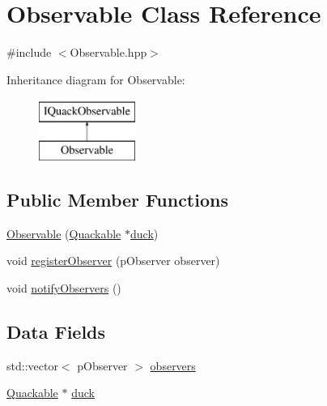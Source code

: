 \hypertarget{classObservable}{\section{Observable Class Reference}
\label{classObservable}
}


{\ttfamily \#include $<$Observable.\-hpp$>$}

Inheritance diagram for Observable\-:\begin{figure}[H]
\begin{center}
\leavevmode
\includegraphics[height=2.000000cm]{classObservable}
\end{center}
\end{figure}
\subsection*{Public Member Functions}
\begin{DoxyCompactItemize}
\item 
\hyperlink{classObservable_a59998e0044f29315ab3ba641a8a5c778}{Observable} (\hyperlink{classQuackable}{Quackable} $\ast$\hyperlink{classObservable_ae1a02e816895e53c27e3229666756a2c}{duck})
\item 
void \hyperlink{classObservable_ac6a84599589838adccb4d182182e645f}{register\-Observer} (p\-Observer observer)
\item 
void \hyperlink{classObservable_ad88b0ad8e623c5450ac3857daeb1c330}{notify\-Observers} ()
\end{DoxyCompactItemize}
\subsection*{Data Fields}
\begin{DoxyCompactItemize}
\item 
std\-::vector$<$ p\-Observer $>$ \hyperlink{classObservable_aabdb218af3f0e4e48d0c3bfa03069801}{observers}
\item 
\hyperlink{classQuackable}{Quackable} $\ast$ \hyperlink{classObservable_ae1a02e816895e53c27e3229666756a2c}{duck}
\end{DoxyCompactItemize}


